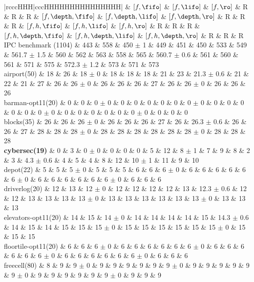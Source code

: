 \begin{center}
\begin{tabular}{|rcccHHH|cccHHHHHHHHHHHHHHH|}
\hline
 & \([f,\fifo]\) & \([f,\lifo]\) & \([f,\ro]\) & R & R & R & \([f,\depth,\fifo]\) & \([f,\depth,\lifo]\) & \([f,\depth,\ro]\) & R & R & R & \([f,h,\fifo]\) & \([f,h,\lifo]\) & \([f,h,\ro]\) & R & R & R & \([f,h,\depth,\fifo]\) & \([f,h,\depth,\lifo]\) & \([f,h,\depth,\ro]\) & R & R & R\\
\hline
IPC benchmark (1104) & 443 & 558 & 450 \(\pm\) 1 & 449 & 451 & 450 & 533 & 549 & 561.7 \(\pm\) 1.5 & 560 & 562 & 563 & 558 & 565 & 560.7 \(\pm\) 0.6 & 561 & 560 & 561 & 571 & 575 & 572.3 \(\pm\) 1.2 & 573 & 571 & 573\\
\hline
airport(50) & 18 & 26 & 18 \(\pm\) 0 & 18 & 18 & 18 & 21 & 23 & 21.3 \(\pm\) 0.6 & 21 & 22 & 21 & 27 & 26 & 26 \(\pm\) 0 & 26 & 26 & 26 & 27 & 26 & 26 \(\pm\) 0 & 26 & 26 & 26\\
barman-opt11(20) & 0 & 0 & 0 \(\pm\) 0 & 0 & 0 & 0 & 0 & 0 & 0 \(\pm\) 0 & 0 & 0 & 0 & 0 & 0 & 0 \(\pm\) 0 & 0 & 0 & 0 & 0 & 0 & 0 \(\pm\) 0 & 0 & 0 & 0\\
blocks(35) & 26 & 26 & 26 \(\pm\) 0 & 26 & 26 & 26 & 27 & 26 & 26.3 \(\pm\) 0.6 & 26 & 26 & 27 & 28 & 28 & 28 \(\pm\) 0 & 28 & 28 & 28 & 28 & 28 & 28 \(\pm\) 0 & 28 & 28 & 28\\
\textbf{cybersec(19)} & 0 & 3 & 0 \(\pm\) 0 & 0 & 0 & 0 & 5 & 12 & 8 \(\pm\) 1 & 7 & 9 & 8 & 2 & 3 & 4.3 \(\pm\) 0.6 & 4 & 5 & 4 & 8 & 12 & 10 \(\pm\) 1 & 11 & 9 & 10\\
depot(22) & 5 & 5 & 5 \(\pm\) 0 & 5 & 5 & 5 & 6 & 6 & 6 \(\pm\) 0 & 6 & 6 & 6 & 6 & 6 & 6 \(\pm\) 0 & 6 & 6 & 6 & 6 & 6 & 6 \(\pm\) 0 & 6 & 6 & 6\\
driverlog(20) & 12 & 13 & 12 \(\pm\) 0 & 12 & 12 & 12 & 12 & 13 & 12.3 \(\pm\) 0.6 & 12 & 12 & 13 & 13 & 13 & 13 \(\pm\) 0 & 13 & 13 & 13 & 13 & 13 & 13 \(\pm\) 0 & 13 & 13 & 13\\
elevators-opt11(20) & 14 & 15 & 14 \(\pm\) 0 & 14 & 14 & 14 & 14 & 15 & 14.3 \(\pm\) 0.6 & 14 & 15 & 14 & 15 & 15 & 15 \(\pm\) 0 & 15 & 15 & 15 & 15 & 15 & 15 \(\pm\) 0 & 15 & 15 & 15\\
floortile-opt11(20) & 6 & 6 & 6 \(\pm\) 0 & 6 & 6 & 6 & 6 & 6 & 6 \(\pm\) 0 & 6 & 6 & 6 & 6 & 6 & 6 \(\pm\) 0 & 6 & 6 & 6 & 6 & 6 & 6 \(\pm\) 0 & 6 & 6 & 6\\
freecell(80) & 8 & 9 & 9 \(\pm\) 0 & 9 & 9 & 9 & 9 & 9 & 9 \(\pm\) 0 & 9 & 9 & 9 & 9 & 9 & 9 \(\pm\) 0 & 9 & 9 & 9 & 9 & 9 & 9 \(\pm\) 0 & 9 & 9 & 9\\

\end{tabular}
\end{center}

